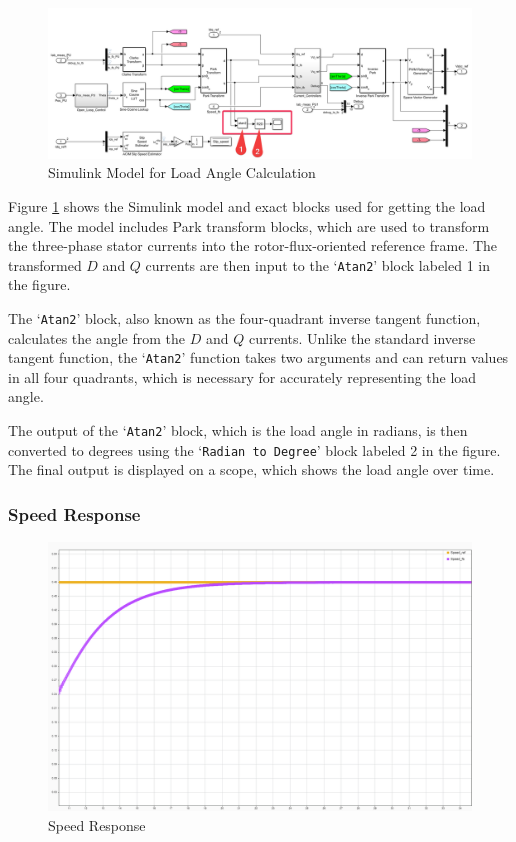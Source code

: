 \begin{figure}[H]
	\centering
	\includegraphics[width=6in]{sections/section3/images/simulationResutls/howTogetloadAngle.png}
	\caption{Simulink Model for Load Angle Calculation}
	\label{fig:loadAngleBlocks}
\end{figure}


Figure \ref{fig:loadAngleBlocks} shows the Simulink model and exact blocks used for getting the load angle. The model includes Park transform blocks, which are used to transform the three-phase stator currents into the rotor-flux-oriented reference frame. The transformed $D$ and $Q$ currents are then input to the `\texttt{Atan2}' block labeled 1 in the figure.

The `\texttt{Atan2}' block, also known as the four-quadrant inverse tangent function, calculates the angle from the $D$ and $Q$ currents. Unlike the standard inverse tangent function, the `\texttt{Atan2}' function takes two arguments and can return values in all four quadrants, which is necessary for accurately representing the load angle.

The output of the `\texttt{Atan2}' block, which is the load angle in radians, is then converted to degrees using the `\texttt{Radian to Degree}' block labeled 2 in the figure. The final output is displayed on a scope, which shows the load angle over time.




\subsubsection{Speed Response}

\begin{figure}[H]
	\centering
	\includegraphics[width=6in]{sections/section3/images/simulationResutls/SpeedTrackingNoCursor.png}
	\caption{Speed Response}
	\label{fig:speed_response}
\end{figure}

